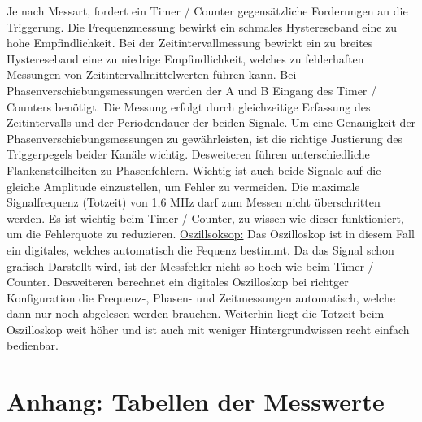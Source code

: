 \documentclass[footsepline,11pt,oneside,a4paper]{scrartcl}
\begin{document}
\newline
Je nach Messart, fordert ein Timer / Counter gegensätzliche Forderungen an die Triggerung. Die Frequenzmessung bewirkt ein schmales Hystereseband eine zu hohe Empfindlichkeit.
\newline
Bei der Zeitintervallmessung bewirkt ein zu breites Hystereseband eine zu niedrige Empfindlichkeit, welches zu fehlerhaften Messungen von Zeitintervallmittelwerten führen kann. 
\newline
Bei Phasenverschiebungsmessungen werden der A und B Eingang des Timer / Counters benötigt. Die Messung erfolgt durch gleichzeitige Erfassung des Zeitintervalls und der Periodendauer der beiden Signale.
\newline
Um eine Genauigkeit der Phasenverschiebungsmessungen zu gewährleisten, ist die richtige Justierung des Triggerpegels beider Kanäle wichtig. Desweiteren führen unterschiedliche Flankensteilheiten zu Phasenfehlern. Wichtig ist auch beide Signale auf die gleiche Amplitude einzustellen, um Fehler zu vermeiden.
\newline
Die maximale Signalfrequenz (Totzeit) von 1,6 MHz darf zum Messen nicht überschritten werden.
\newline
Es ist wichtig beim Timer / Counter, zu wissen wie dieser funktioniert, um die Fehlerquote zu reduzieren. 
\newline
\newline
\newline
\newline
\underline{Oszillsoksop:}
\newline
\newline
Das Oszilloskop ist in diesem Fall ein digitales, welches automatisch die Fequenz bestimmt. 
Da das Signal schon grafisch Darstellt wird, ist der Messfehler nicht so hoch wie beim Timer / Counter. 
\newline
Desweiteren berechnet ein digitales Oszilloskop bei richtger Konfiguration die Frequenz-, Phasen- und Zeitmessungen automatisch, welche dann nur noch abgelesen werden brauchen.
\newline
Weiterhin liegt die Totzeit beim Oszilloskop weit höher und ist auch mit weniger Hintergrundwissen recht einfach bedienbar. 

\newline
\newpage
\section{Anhang: Tabellen der Messwerte}
\end{document}
